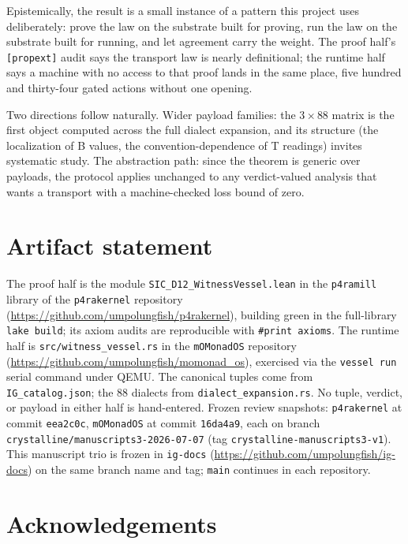 \documentclass[12pt,a4paper]{article}
\newcommand{\bT}{\textsf{T}}
\newcommand{\bB}{\textsf{B}}
\begin{document}
Epistemically, the result is a small instance of a pattern this project uses
deliberately: prove the law on the substrate built for proving, run the law on
the substrate built for running, and let agreement carry the weight.  The proof
half's \texttt{[propext]} audit says the transport law is nearly definitional;
the runtime half says a machine with no access to that proof lands in the same
place, five hundred and thirty-four gated actions without one opening.

Two directions follow naturally.  Wider payload families: the $3 \times 88$
matrix is the first object computed across the full dialect expansion, and its
structure (the localization of \bB{} values, the convention-dependence of
\bT{} readings) invites systematic study.  The abstraction path: since the
theorem is generic over payloads, the protocol applies unchanged to any
verdict-valued analysis that wants a transport with a machine-checked loss bound
of zero.

\section{Artifact statement}

The proof half is the module
\texttt{SIC\_D12\_WitnessVessel.lean} in the \texttt{p4ramill} library of the
\texttt{p4rakernel} repository
(\url{https://github.com/umpolungfish/p4rakernel}), building green in the
full-library \texttt{lake build}; its axiom audits are reproducible with
\texttt{\#print axioms}.  The runtime half is \texttt{src/witness\_vessel.rs} in
the \texttt{mOMonadOS} repository
(\url{https://github.com/umpolungfish/momonad_os}), exercised via the
\texttt{vessel run} serial command under QEMU.  The canonical tuples come from
\texttt{IG\_catalog.json}; the $88$ dialects from \texttt{dialect\_expansion.rs}.
No tuple, verdict, or payload in either half is hand-entered.  Frozen review
snapshots: \texttt{p4rakernel} at commit \texttt{eea2c0c}, \texttt{mOMonadOS} at
commit \texttt{16da4a9}, each on branch \texttt{crystalline/manuscripts3-2026-07-07}
(tag \texttt{crystalline-manuscripts3-v1}).  This manuscript trio is frozen in
\texttt{ig-docs} (\url{https://github.com/umpolungfish/ig-docs}) on the same
branch name and tag; \texttt{main} continues in each repository.

\section{Acknowledgements}
\end{document}
